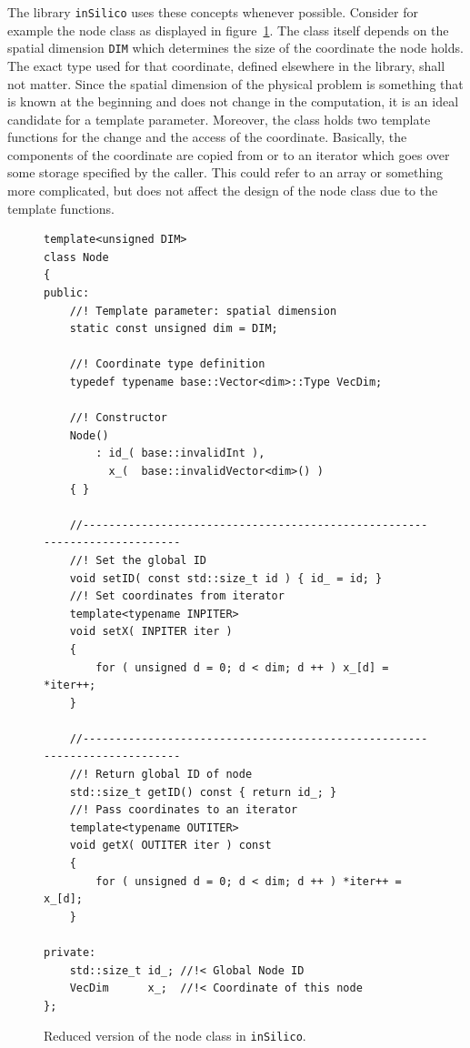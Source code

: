 \documentclass[a4paper,DIV=12,10pt]{scrartcl}
\newcommand{\IS}[0]{\texttt{inSilico}}
\begin{document}
The library \IS{} uses these concepts whenever possible. Consider for
example the node class as displayed in figure~\ref{fig:node}. The
class itself depends on the spatial dimension \texttt{DIM} which
determines the size of the coordinate the node holds. The exact type
used for that coordinate, defined elsewhere in the library, shall not
matter. Since the spatial dimension of the physical problem is
something that is known at the beginning and does not change in the
computation, it is an ideal candidate for a template
parameter. Moreover, the class holds two template functions for the
change and the access of the coordinate. Basically, the components of
the coordinate are copied from or to an iterator which goes over some
storage specified by the caller. This could refer to an array or
something more complicated, but does not affect the design of the node
class due to the template functions.

\begin{figure}[htbp]
  \centering
  \begin{verbatim}
template<unsigned DIM>
class Node
{
public:
    //! Template parameter: spatial dimension
    static const unsigned dim = DIM;

    //! Coordinate type definition
    typedef typename base::Vector<dim>::Type VecDim;

    //! Constructor
    Node()
        : id_( base::invalidInt ),
          x_(  base::invalidVector<dim>() )
    { }

    //--------------------------------------------------------------------------
    //! Set the global ID
    void setID( const std::size_t id ) { id_ = id; }
    //! Set coordinates from iterator
    template<typename INPITER>
    void setX( INPITER iter )
    {
        for ( unsigned d = 0; d < dim; d ++ ) x_[d] = *iter++;
    }

    //--------------------------------------------------------------------------
    //! Return global ID of node
    std::size_t getID() const { return id_; }
    //! Pass coordinates to an iterator
    template<typename OUTITER>
    void getX( OUTITER iter ) const
    {
        for ( unsigned d = 0; d < dim; d ++ ) *iter++ = x_[d];
    }
    
private:
    std::size_t id_; //!< Global Node ID
    VecDim      x_;  //!< Coordinate of this node
};
  \end{verbatim}
  \caption{Reduced version of the node class in \IS.}
  \label{fig:node}
\end{figure}
\end{document}
